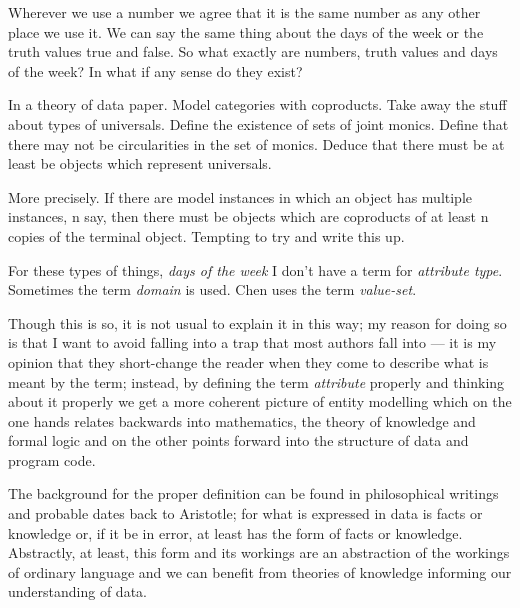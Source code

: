 \mynote  Wherever we use a number we agree that it is the same number as any other place we use it. We can say the same thing about the days of the week or
the truth values true and false. 
So what exactly are  numbers, truth values and days of the week? In what if any sense do they exist? 
\begin{notebox}[theory]
In a theory of data paper. Model categories with coproducts. Take away
the stuff about types of universals. Define the existence of sets of joint monics. 
Define that there may not be circularities in the set of monics. Deduce that there must be at least be objects which represent universals.

More precisely. If there are model instances in which an object has multiple instances,
n say, then there must be objects which are coproducts of at least n copies of the terminal object. Tempting to try and write this up. 
\end{notebox}

\mynote For these types of things, \textit{days of the week} 
\mynote I don't have a term for \textit{attribute type}. 
\mynote Sometimes the term \textit{domain} is used.
\mynote Chen uses the term \textit{value-set}.

\mynote
Though this is so, it is not usual to explain it in this way; my reason for doing so is that
I want to avoid falling into a trap that most authors fall into ---
it is my opinion that they short-change the reader when they come to describe what is meant by the term; instead, by defining the term \textit{attribute} properly and thinking about it properly 
we get a more coherent picture of entity modelling 
which on the one hands relates backwards into mathematics, the theory of knowledge and formal logic and on the other
points forward into the structure of data and program code. 

\mynote The background for the proper definition can be found in philosophical writings and probable dates back to Aristotle; for what is expressed in data is facts or knowledge or, if it be in error, at least has the form of facts or knowledge. Abstractly, at least, this form and its workings are an abstraction of the workings of ordinary language and  we can benefit from theories of knowledge informing our understanding of data.

